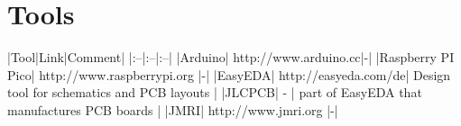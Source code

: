 \section{Tools}

|Tool|Link|Comment|
|:--|:--|:--|
|Arduino| http://www.arduino.cc|-|
|Raspberry PI Pico| http://www.raspberrypi.org |-|
|EasyEDA| http://easyeda.com/de| Design tool for schematics and PCB layouts |
|JLCPCB| - | part of EasyEDA that manufactures PCB boards |
|JMRI| http://www.jmri.org |-|
